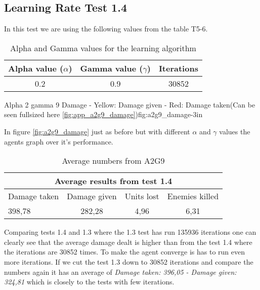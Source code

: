 \subsection*{Learning Rate Test 1.4}
In this test we are using the following values from the table T5-6.


\begin{centering}
\begin{table}[H]
 \begin{tabular}{|c|c|c|}
	\hline
		Alpha value ($\alpha$) & Gamma value ($\gamma$) & Iterations\\
	\hline
		0.2 & 0.9 & 30852 \\
	\hline
\end{tabular}
\label{a2g9_table}
\caption{Alpha and Gamma values for the learning algorithm}
\end{table}
\end{centering}

			{Alpha 2 gamma 9 Damage - Yellow: Damage given - Red: Damage taken(Can be seen fullsized here \ref{fig:app_a2g9_damage})}{fig:a2g9_damage}{-3in}

In figure \ref{fig:a2g9_damage} just as before but with different $\alpha$ and $\gamma$ values the agents graph over it's performance.




\begin{centering}
\begin{table}
 \begin{tabular}{|l|c|c|c|}
	\multicolumn{4}{c}{Average results from test 1.4} \\
	\hline
		Damage taken & Damage given & Units lost & Enemies killed\\
	\hline
		398,78 & 282,28 & 4,96 & 6,31 \\
		\hline
\end{tabular}

\label{test1.4}
\caption{Average numbers from A2G9}
\end{table}
\end{centering}


Comparing tests 1.4 and 1.3 where the 1.3 test has run 135936 iterations one can clearly see that the average damage dealt is higher than from the test 1.4 where the iterations are 30852 times. To make the agent converge is has to run even more iterations. If we cut the test 1.3 down to 30852 iterations and compare the numbers again it has an average of \textit{Damage taken: 396,05 - Damage given: 324,81} which is closely to the tests with few iterations.